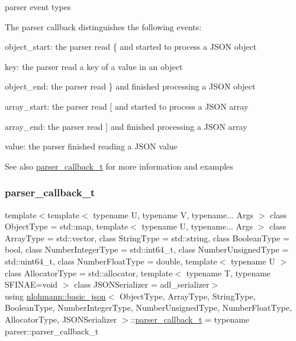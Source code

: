 parser event types 

The parser callback distinguishes the following events\+:
\begin{DoxyItemize}
\item {\ttfamily object\+\_\+start}\+: the parser read {\ttfamily \{} and started to process a J\+S\+ON object
\item {\ttfamily key}\+: the parser read a key of a value in an object
\item {\ttfamily object\+\_\+end}\+: the parser read {\ttfamily \}} and finished processing a J\+S\+ON object
\item {\ttfamily array\+\_\+start}\+: the parser read {\ttfamily \mbox{[}} and started to process a J\+S\+ON array
\item {\ttfamily array\+\_\+end}\+: the parser read {\ttfamily \mbox{]}} and finished processing a J\+S\+ON array
\item {\ttfamily value}\+: the parser finished reading a J\+S\+ON value
\end{DoxyItemize}

 \begin{DoxySeeAlso}{See also}
\mbox{\hyperlink{classnlohmann_1_1basic__json_ab4f78c5f9fd25172eeec84482e03f5b7}{parser\+\_\+callback\+\_\+t}} for more information and examples 
\end{DoxySeeAlso}
\mbox{\label{classnlohmann_1_1basic__json_ab4f78c5f9fd25172eeec84482e03f5b7}} 
\subsubsection{\texorpdfstring{parser\+\_\+callback\+\_\+t}{parser\_callback\_t}}
{\footnotesize\ttfamily template$<$template$<$ typename U, typename V, typename... Args $>$ class Object\+Type = std\+::map, template$<$ typename U, typename... Args $>$ class Array\+Type = std\+::vector, class String\+Type  = std\+::string, class Boolean\+Type  = bool, class Number\+Integer\+Type  = std\+::int64\+\_\+t, class Number\+Unsigned\+Type  = std\+::uint64\+\_\+t, class Number\+Float\+Type  = double, template$<$ typename U $>$ class Allocator\+Type = std\+::allocator, template$<$ typename T, typename S\+F\+I\+N\+A\+E=void $>$ class J\+S\+O\+N\+Serializer = adl\+\_\+serializer$>$ \\
using \mbox{\hyperlink{classnlohmann_1_1basic__json}{nlohmann\+::basic\+\_\+json}}$<$ Object\+Type, Array\+Type, String\+Type, Boolean\+Type, Number\+Integer\+Type, Number\+Unsigned\+Type, Number\+Float\+Type, Allocator\+Type, J\+S\+O\+N\+Serializer $>$\+::\mbox{\hyperlink{classnlohmann_1_1basic__json_ab4f78c5f9fd25172eeec84482e03f5b7}{parser\+\_\+callback\+\_\+t}} =  typename parser\+::parser\+\_\+callback\+\_\+t}



